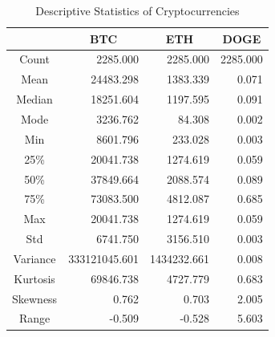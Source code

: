 \documentclass{ieeeojies}
\begin{document}
\begin{table}[H]
    \centering
    \renewcommand{\arraystretch}{1.2} %
    \begin{tabular}{|c|r|r|r|}
        \hline
                 & \multicolumn{1}{c|}{\textbf{BTC}} & \multicolumn{1}{c|}{\textbf{ETH}} & \multicolumn{1}{c|}{\textbf{DOGE}} \\
        \hline
        Count    & 2285.000                          & 2285.000                          & 2285.000                           \\
        \hline
        Mean     & 24483.298                         & 1383.339                          & 0.071                              \\
        \hline
        Median   & 18251.604                         & 1197.595                          & 0.091                              \\
        \hline
        Mode     & 3236.762                          & 84.308                            & 0.002                              \\
        \hline
        Min      & 8601.796                          & 233.028                           & 0.003                              \\
        \hline
        25\%     & 20041.738                         & 1274.619                          & 0.059                              \\
        \hline
        50\%     & 37849.664                         & 2088.574                          & 0.089                              \\
        \hline
        75\%     & 73083.500                         & 4812.087                          & 0.685                              \\
        \hline
        Max      & 20041.738                         & 1274.619                          & 0.059                              \\
        \hline
        Std      & 6741.750                          & 3156.510                          & 0.003                              \\
        \hline
        Variance & 333121045.601                     & 1434232.661                       & 0.008                              \\
        \hline
        Kurtosis & 69846.738                         & 4727.779                          & 0.683                              \\
        \hline
        Skewness & 0.762                             & 0.703                             & 2.005                              \\
        \hline
        Range    & -0.509                            & -0.528                            & 5.603                              \\
        \hline
    \end{tabular}
    \caption{Descriptive Statistics of Cryptocurrencies}
    \label{table:1}
\end{table}
\end{document}
